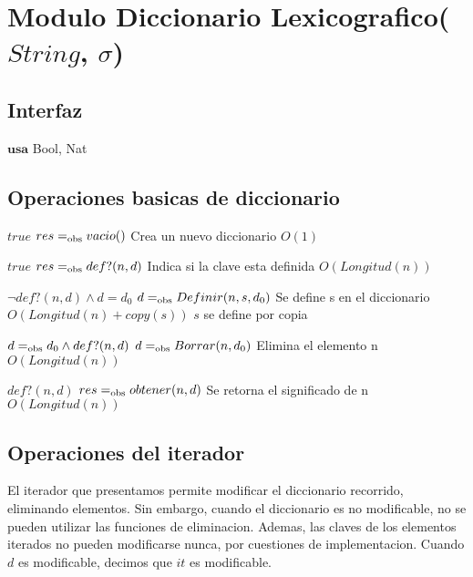 \section{Modulo Diccionario Lexicografico($String$, $\sigma$)}

\subsection{Interfaz}

$\textbf{usa}$ Bool, Nat

  \subsection{Operaciones basicas de diccionario}

 {$true$}
 {$res =_{\mathrm{obs}} vacio()$}
 {Crea un nuevo diccionario}
 {$O(1)$}
 {}

 
  {$true$}
  {$res =_{\mathrm{obs}} def?(n,d)$}
  {Indica si la clave esta definida}
  {$O(Longitud(n))$}
  {}

  {$\neg def?(n,d) \land d=d_0$}
  {$d =_{\mathrm{obs}} Definir(n, s, d_0)$}
  {Se define s en el diccionario}
  {$O(Longitud(n)+copy(s))$}
  {$s$ se define por copia}

 {$d =_{\mathrm{obs}} d_0 \land def?(n,d)$}
 {$d =_{\mathrm{obs}} Borrar(n,d_0)$}
 {Elimina el elemento n}
 {$O(Longitud(n))$}
 {}

 {$def?(n,d)$}
 {$res =_{\mathrm{obs}} obtener(n,d)$}
 {Se retorna el significado de n}
 {$O(Longitud(n))$}
 {}

 
  \subsection{Operaciones del iterador}

  El iterador que presentamos permite modificar el diccionario recorrido, eliminando elementos.  Sin embargo, cuando el diccionario es no modificable, no se pueden utilizar las funciones de eliminacion.  Ademas, las claves de los elementos iterados no pueden modificarse nunca, por cuestiones de implementacion.  Cuando $d$ es modificable, decimos que $it$ es modificable.
  

